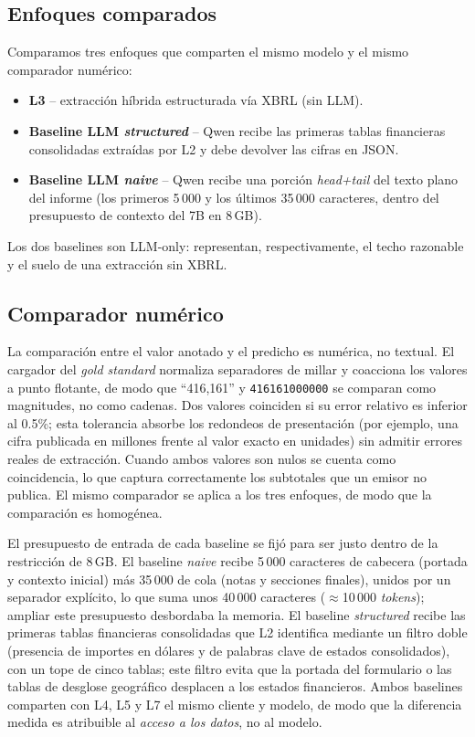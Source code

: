 \documentclass[conference]{IEEEtran}
\begin{document}
\subsection{Enfoques comparados}
Comparamos tres enfoques que comparten el mismo modelo y el mismo comparador
numérico:
\begin{itemize}
  \item \textbf{L3} -- extracción híbrida estructurada vía XBRL (sin LLM).
  \item \textbf{Baseline LLM \textit{structured}} -- Qwen recibe las primeras
  tablas financieras consolidadas extraídas por L2 y debe devolver las cifras en
  JSON.
  \item \textbf{Baseline LLM \textit{naive}} -- Qwen recibe una porción
  \textit{head+tail} del texto plano del informe (los primeros 5\,000 y los
  últimos 35\,000 caracteres, dentro del presupuesto de contexto del 7B en
  8\,GB).
\end{itemize}
Los dos baselines son LLM-only: representan, respectivamente, el techo razonable
y el suelo de una extracción sin XBRL.

\subsection{Comparador numérico}
La comparación entre el valor anotado y el predicho es numérica, no textual. El
cargador del \textit{gold standard} normaliza separadores de millar y coacciona
los valores a punto flotante, de modo que ``416,161'' y \texttt{416161000000} se
comparan como magnitudes, no como cadenas. Dos valores coinciden si su error
relativo es inferior al 0.5\%; esta tolerancia absorbe los redondeos de
presentación (por ejemplo, una cifra publicada en millones frente al valor exacto
en unidades) sin admitir errores reales de extracción. Cuando ambos valores son
nulos se cuenta como coincidencia, lo que captura correctamente los subtotales que
un emisor no publica. El mismo comparador se aplica a los tres enfoques, de modo
que la comparación es homogénea.

El presupuesto de entrada de cada baseline se fijó para ser justo dentro de la
restricción de 8\,GB. El baseline \textit{naive} recibe 5\,000 caracteres de
cabecera (portada y contexto inicial) más 35\,000 de cola (notas y secciones
finales), unidos por un separador explícito, lo que suma unos 40\,000 caracteres
($\approx$10\,000 \textit{tokens}); ampliar este presupuesto desbordaba la
memoria. El baseline \textit{structured} recibe las primeras tablas financieras
consolidadas que L2 identifica mediante un filtro doble (presencia de importes en
dólares y de palabras clave de estados consolidados), con un tope de cinco tablas;
este filtro evita que la portada del formulario o las tablas de desglose
geográfico desplacen a los estados financieros. Ambos baselines comparten con L4,
L5 y L7 el mismo cliente y modelo, de modo que la diferencia medida es atribuible
al \emph{acceso a los datos}, no al modelo.
\end{document}
